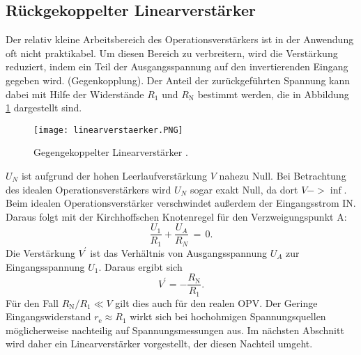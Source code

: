 \documentclass[
  bibliography=totoc,     %
  captions=tableheading,  %
  titlepage=firstiscover, %
]{scrartcl}
\begin{document}
\subsection{Rückgekoppelter Linearverstärker}
\label{subsubsec:rueck-linearverstärker}
Der relativ kleine Arbeitsbereich des Operationsverstärkers ist in der
Anwendung oft nicht praktikabel. Um diesen Bereich zu verbreitern, wird die
Verstärkung reduziert, indem ein Teil der Ausgangsspannung auf den
invertierenden Eingang gegeben wird. (Gegenkopplung).
Der Anteil der zurückgeführten Spannung kann dabei mit Hilfe der Widerstände
$R_1$ und $R_\text{N}$ bestimmt werden, die in Abbildung \ref{fig:linear}
dargestellt sind.
\begin{figure}[H]
    \centering
    \texttt{[image: linearverstaerker.PNG]}
    \caption{Gegengekoppelter Linearverstärker \cite{V51}.}
    \label{fig:linear}
\end{figure}
\noindent
$U_N$ ist aufgrund der hohen Leerlaufverstärkung $V$ nahezu Null. Bei Betrachtung
des idealen Operationsverstärkers wird $U_N$ sogar exakt Null, da dort
$V -> \inf$. Beim idealen Operationsverstärker verschwindet außerdem
der Eingangsstrom IN. Daraus folgt mit der Kirchhoffschen Knotenregel für
den Verzweigungspunkt A:
\begin{equation}
  \frac{U_1}{R_1} + \frac{U_A}{R_N}\,=\,0.
\end{equation}
Die Verstärkung $V^\prime$ ist das Verhältnis von Ausgangsspannung $U_A$ zur Eingangsspannung
$U_1$. Daraus ergibt sich
\begin{equation}
  V^\prime = -\frac{R_\text{N}}{R_1}.
  \label{eqn:v'lingegen}
\end{equation}
Für den Fall $R_\text{N}/R_1 \ll V$ gilt dies auch für den realen OPV.
Der Geringe Eingangswiderstand $r_\text{e} \approx R_1$ wirkt sich bei
hochohmigen Spannungsquellen möglicherweise nachteilig auf Spannungsmessungen aus.
Im nächsten Abschnitt wird daher ein Linearverstärker vorgestellt, der diesen Nachteil
umgeht.
\end{document}
